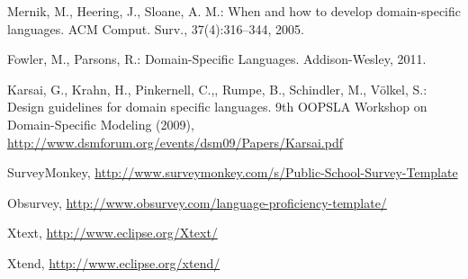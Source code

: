 \documentclass[runningheads]{llncs}
\begin{document}
\begin{thebibliography}{4}

 Mernik, M., Heering, J., Sloane, A. M.: When and how to develop domain-specific languages. ACM Comput. Surv., 37(4):316–344, 2005.

  Fowler, M., Parsons, R.: Domain-Specific Languages. Addison-Wesley, 2011.

 Karsai, G., Krahn, H., Pinkernell, C.,, Rumpe, B., Schindler, M., Völkel, S.: Design guidelines for domain specific languages. 
9th OOPSLA Workshop on Domain-Specific Modeling (2009), \url{http://www.dsmforum.org/events/dsm09/Papers/Karsai.pdf}

SurveyMonkey, \url{http://www.surveymonkey.com/s/Public-School-Survey-Template}

Obsurvey, \url{http://www.obsurvey.com/language-proficiency-template/}

Xtext, \url{http://www.eclipse.org/Xtext/}

Xtend, \url{http://www.eclipse.org/xtend/}

\end{thebibliography}
\end{document}

